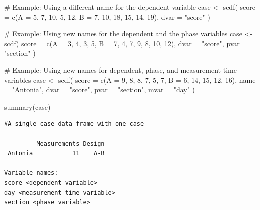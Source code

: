 \documentclass[
  letterpaper,
  DIV=11,
  numbers=noendperiod]{scrreprt}
\newenvironment{Shaded}{\begin{snugshade}}{\end{snugshade}}
\newcommand{\AttributeTok}[1]{\textcolor[rgb]{0.40,0.45,0.13}{#1}}
\newcommand{\CommentTok}[1]{\textcolor[rgb]{0.37,0.37,0.37}{#1}}
\newcommand{\DecValTok}[1]{\textcolor[rgb]{0.68,0.00,0.00}{#1}}
\newcommand{\FunctionTok}[1]{\textcolor[rgb]{0.28,0.35,0.67}{#1}}
\newcommand{\NormalTok}[1]{\textcolor[rgb]{0.00,0.23,0.31}{#1}}
\newcommand{\OtherTok}[1]{\textcolor[rgb]{0.00,0.23,0.31}{#1}}
\newcommand{\StringTok}[1]{\textcolor[rgb]{0.13,0.47,0.30}{#1}}
\begin{document}
\begin{Shaded}
\begin{Highlighting}[]
\CommentTok{\# Example: Using a different name for the dependent variable}
\NormalTok{case }\OtherTok{\textless{}{-}} \FunctionTok{scdf}\NormalTok{(}
  \AttributeTok{score =} \FunctionTok{c}\NormalTok{(}\AttributeTok{A =} \DecValTok{5}\NormalTok{, }\DecValTok{7}\NormalTok{, }\DecValTok{10}\NormalTok{, }\DecValTok{5}\NormalTok{, }\DecValTok{12}\NormalTok{, }\AttributeTok{B =} \DecValTok{7}\NormalTok{, }\DecValTok{10}\NormalTok{, }\DecValTok{18}\NormalTok{, }\DecValTok{15}\NormalTok{, }\DecValTok{14}\NormalTok{, }\DecValTok{19}\NormalTok{), }
  \AttributeTok{dvar =} \StringTok{"score"}
\NormalTok{)}

\CommentTok{\# Example: Using new names for the dependent and the phase variables}
\NormalTok{case }\OtherTok{\textless{}{-}} \FunctionTok{scdf}\NormalTok{(}
  \AttributeTok{score =} \FunctionTok{c}\NormalTok{(}\AttributeTok{A =} \DecValTok{3}\NormalTok{, }\DecValTok{4}\NormalTok{, }\DecValTok{3}\NormalTok{, }\DecValTok{5}\NormalTok{, }\AttributeTok{B =} \DecValTok{7}\NormalTok{, }\DecValTok{4}\NormalTok{, }\DecValTok{7}\NormalTok{, }\DecValTok{9}\NormalTok{, }\DecValTok{8}\NormalTok{, }\DecValTok{10}\NormalTok{, }\DecValTok{12}\NormalTok{), }
  \AttributeTok{dvar =} \StringTok{"score"}\NormalTok{, }\AttributeTok{pvar =} \StringTok{"section"}
\NormalTok{)}

\CommentTok{\# Example: Using new names for dependent, phase, and measurement{-}time variables}
\NormalTok{case }\OtherTok{\textless{}{-}} \FunctionTok{scdf}\NormalTok{(}
  \AttributeTok{score =} \FunctionTok{c}\NormalTok{(}\AttributeTok{A =} \DecValTok{9}\NormalTok{, }\DecValTok{8}\NormalTok{, }\DecValTok{8}\NormalTok{, }\DecValTok{7}\NormalTok{, }\DecValTok{5}\NormalTok{, }\DecValTok{7}\NormalTok{, }\AttributeTok{B =} \DecValTok{6}\NormalTok{, }\DecValTok{14}\NormalTok{, }\DecValTok{15}\NormalTok{, }\DecValTok{12}\NormalTok{, }\DecValTok{16}\NormalTok{), }
  \AttributeTok{name =} \StringTok{"Antonia"}\NormalTok{, }\AttributeTok{dvar =} \StringTok{"score"}\NormalTok{, }\AttributeTok{pvar =} \StringTok{"section"}\NormalTok{, }\AttributeTok{mvar =} \StringTok{"day"}
\NormalTok{)}

\FunctionTok{summary}\NormalTok{(case)}
\end{Highlighting}
\end{Shaded}

\begin{verbatim}
#A single-case data frame with one case

         Measurements Design
 Antonia           11    A-B

Variable names:
score <dependent variable>
day <measurement-time variable>
section <phase variable>
\end{verbatim}
\end{document}

